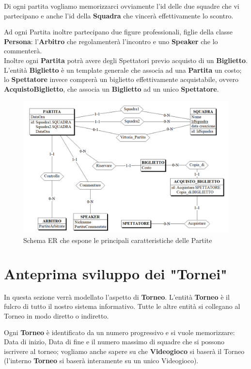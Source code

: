 \documentclass[a4paper,12pt]{report}
\begin{document}
Di ogni partita vogliamo memorizzarci ovviamente l'id delle due squadre che vi partecipano e anche l'id della \textbf{Squadra} che vincerà effettivamente lo scontro.

Ad ogni Partita inoltre partecipano due figure professionali, figlie della classe \textbf{Persona}: l'\textbf{Arbitro} che regolamenterà l'incontro e uno \textbf{Speaker} che lo commenterà.\\

Inoltre ogni \textbf{Partita} potrà avere degli Spettatori previo acquisto di un \textbf{Biglietto}. L'entità \textbf{Biglietto} è un template generale che associa ad una \textbf{Partita} un costo; lo \textbf{Spettatore} invece comprerà un biglietto effettivamente acquistabile, ovvero \textbf{AcquistoBiglietto}, che associa un \textbf{Biglietto} ad un unico \textbf{Spettatore}.
\begin{figure}[!htb]
	\centerline{\includegraphics[scale=0.6]{img/ER_Partite.png}}
	\caption{Schema ER che espone le principali caratteristiche delle Partite}
	\label{img:ER_Partite}
\end{figure}
\section{Anteprima sviluppo dei "Tornei"}
In questa sezione verrà modellato l'aspetto di \textbf{Torneo}.
L'entità \textbf{Torneo} è il fulcro di tutto il nostro sistema informativo. Tutte le altre entità si collegano al Torneo in modo diretto o indiretto. 

Ogni \textbf{Torneo} è identificato da un numero progressivo e si vuole memorizzare: Data di inizio, Data di fine e il numero massimo di squadre che si possono iscrivere al torneo; vogliamo anche sapere su che \textbf{Videogioco} si baserà il Torneo (l'interno \textbf{Torneo} si baserà interamente su un unico Videogioco).
\end{document}
